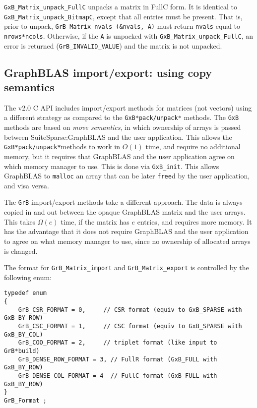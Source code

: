 \documentclass[12pt]{article}
\begin{document}
\verb'GxB_Matrix_unpack_FullC' unpacks a matrix in FullC form.  It is identical
to \verb'GxB_Matrix_unpack_BitmapC', except that all entries must be present.
That is, prior to unpack, \verb'GrB_Matrix_nvals (&nvals, A)' must return
\verb'nvals' equal to \verb'nrows*ncols'.  Otherwise, if the \verb'A' is
unpacked with \newline \verb'GxB_Matrix_unpack_FullC', an error is returned
(\verb'GrB_INVALID_VALUE') and the matrix is not unpacked.

\newpage
\subsection{GraphBLAS import/export: using copy semantics} %
\label{GrB_import_export}

The v2.0 C API includes import/export methods for matrices (not vectors) using
a different strategy as compared to the \verb'GxB*pack/unpack*' methods.  The
\verb'GxB' methods are based on {\em move semantics}, in which ownership of
arrays is passed between SuiteSparse:GraphBLAS and the user application.  This
allows the \verb'GxB*pack/unpack*'methods to work in $O(1)$ time, and require
no additional memory, but it requires that GraphBLAS and the user application
agree on which memory manager to use.  This is done via \verb'GxB_init'.  This
allows GraphBLAS to \verb'malloc' an array that can be later \verb'free'd by
the user application, and visa versa.

The \verb'GrB' import/export methods take a different approach.  The data
is always copied in and out between the opaque GraphBLAS matrix and the
user arrays.  This takes $\Omega(e)$ time, if the matrix has $e$ entries,
and requires more memory.  It has the advantage that it does not require
GraphBLAS and the user application to agree on what memory manager to use,
since no ownership of allocated arrays is changed.

The format for \verb'GrB_Matrix_import' and \verb'GrB_Matrix_export' is
controlled by the following enum:

{\footnotesize
\begin{verbatim}
typedef enum
{
    GrB_CSR_FORMAT = 0,     // CSR format (equiv to GxB_SPARSE with GxB_BY_ROW)
    GrB_CSC_FORMAT = 1,     // CSC format (equiv to GxB_SPARSE with GxB_BY_COL)
    GrB_COO_FORMAT = 2,     // triplet format (like input to GrB*build)
    GrB_DENSE_ROW_FORMAT = 3, // FullR format (GxB_FULL with GxB_BY_ROW)
    GrB_DENSE_COL_FORMAT = 4  // FullC format (GxB_FULL with GxB_BY_ROW)
}
GrB_Format ; \end{verbatim}}
\end{document}
